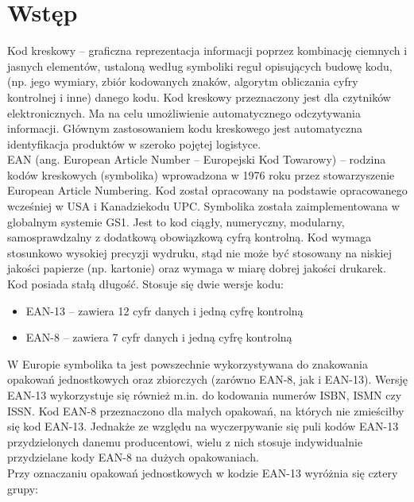 \documentclass[12pt,a4paper,notitlepage]{report}
\begin{document}
\section{Wstęp}
Kod kreskowy – graficzna reprezentacja informacji poprzez kombinację ciemnych i jasnych elementów, ustaloną według symboliki reguł opisujących budowę kodu, (np. jego wymiary, zbiór kodowanych znaków, algorytm obliczania cyfry kontrolnej i inne) danego kodu. Kod kreskowy przeznaczony jest dla czytników elektronicznych. Ma na celu umożliwienie automatycznego odczytywania informacji. Głównym zastosowaniem kodu kreskowego jest automatyczna identyfikacja produktów w szeroko pojętej logistyce.
\\
\indent EAN (ang. European Article Number – Europejski Kod Towarowy) – rodzina kodów kreskowych (symbolika) wprowadzona w 1976 roku przez stowarzyszenie European Article Numbering. Kod został opracowany na podstawie opracowanego wcześniej w USA i Kanadziekodu UPC. Symbolika została zaimplementowana w globalnym systemie GS1. Jest to kod ciągły, numeryczny, modularny, samosprawdzalny z dodatkową obowiązkową cyfrą kontrolną. Kod wymaga stosunkowo wysokiej precyzji wydruku, stąd nie może być stosowany na niskiej jakości papierze (np. kartonie) oraz wymaga w miarę dobrej jakości drukarek.
\\
\indent Kod posiada stałą długość. Stosuje się dwie wersje kodu:
\begin{itemize}
\item EAN-13 – zawiera 12 cyfr danych i jedną cyfrę kontrolną
\item EAN-8 – zawiera 7 cyfr danych i jedną cyfrę kontrolną
\end{itemize}
\indent W Europie symbolika ta jest powszechnie wykorzystywana do znakowania opakowań jednostkowych oraz zbiorczych (zarówno EAN-8, jak i EAN-13). Wersję EAN-13 wykorzystuje się również m.in. do kodowania numerów ISBN, ISMN czy ISSN.
Kod EAN-8 przeznaczono dla małych opakowań, na których nie zmieściłby się kod EAN-13. Jednakże ze względu na wyczerpywanie się puli kodów EAN-13 przydzielonych danemu producentowi, wielu z nich stosuje indywidualnie przydzielane kody EAN-8 na dużych opakowaniach.
\\
\indent Przy oznaczaniu opakowań jednostkowych w kodzie EAN-13 wyróżnia się cztery grupy:
\end{document}
